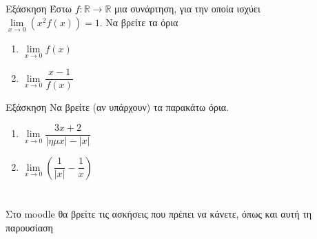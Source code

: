 \documentclass{presentation}
\begin{document}
\begin{frame}{Εξάσκηση}
  Έστω $f:\mathbb{R}\to\mathbb{R}$ μια συνάρτηση, για την οποία ισχύει $\lim\limits_{x \to 0}{ \left( x^2f(x)  \right)  }=1$.
  Να βρείτε τα όρια
  \begin{enumerate}
    \item $\lim\limits_{x \to 0}{ f(x) }$ \pause
    \item $\lim\limits_{x \to 0}{ \dfrac{x-1}{f(x)} }$
  \end{enumerate}
\end{frame}

\begin{frame}{Εξάσκηση}
  Να βρείτε (αν υπάρχουν) τα παρακάτω όρια.
  \begin{enumerate}
    \item $\lim\limits_{x \to 0}{ \dfrac{3x+2}{|ημx|-|x|} }$ \pause
    \item $\lim\limits_{x \to 0}{ \left( \dfrac{1}{|x|}-\dfrac{1}{x}  \right)  }$
  \end{enumerate}
\end{frame}

\section{}
\begin{frame}
  Στο moodle θα βρείτε τις ασκήσεις που πρέπει να κάνετε, όπως και αυτή τη παρουσίαση
\end{frame}
\end{document}
